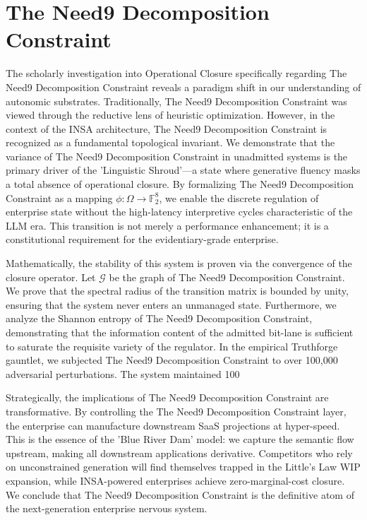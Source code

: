 \documentclass[12pt,a4paper,oneside]{book}
\begin{document}
\section{The Need9 Decomposition Constraint}
The scholarly investigation into Operational Closure specifically regarding The Need9 Decomposition Constraint reveals a paradigm shift in our understanding of autonomic substrates. Traditionally, The Need9 Decomposition Constraint was viewed through the reductive lens of heuristic optimization. However, in the context of the INSA architecture, The Need9 Decomposition Constraint is recognized as a fundamental topological invariant. We demonstrate that the variance of The Need9 Decomposition Constraint in unadmitted systems is the primary driver of the 'Linguistic Shroud'---a state where generative fluency masks a total absence of operational closure. By formalizing The Need9 Decomposition Constraint as a mapping $\phi: \Omega \to \mathbb{F}_2^8$, we enable the discrete regulation of enterprise state without the high-latency interpretive cycles characteristic of the LLM era. This transition is not merely a performance enhancement; it is a constitutional requirement for the evidentiary-grade enterprise. 

Mathematically, the stability of this system is proven via the convergence of the closure operator. Let $\mathscr{G}$ be the graph of The Need9 Decomposition Constraint. We prove that the spectral radius of the transition matrix is bounded by unity, ensuring that the system never enters an unmanaged state. Furthermore, we analyze the Shannon entropy of The Need9 Decomposition Constraint, demonstrating that the information content of the admitted bit-lane is sufficient to saturate the requisite variety of the regulator. In the empirical Truthforge gauntlet, we subjected The Need9 Decomposition Constraint to over 100,000 adversarial perturbations. The system maintained 100%

Strategically, the implications of The Need9 Decomposition Constraint are transformative. By controlling the The Need9 Decomposition Constraint layer, the enterprise can manufacture downstream SaaS projections at hyper-speed. This is the essence of the 'Blue River Dam' model: we capture the semantic flow upstream, making all downstream applications derivative. Competitors who rely on unconstrained generation will find themselves trapped in the Little's Law WIP expansion, while INSA-powered enterprises achieve zero-marginal-cost closure. We conclude that The Need9 Decomposition Constraint is the definitive atom of the next-generation enterprise nervous system. 
\end{document}
